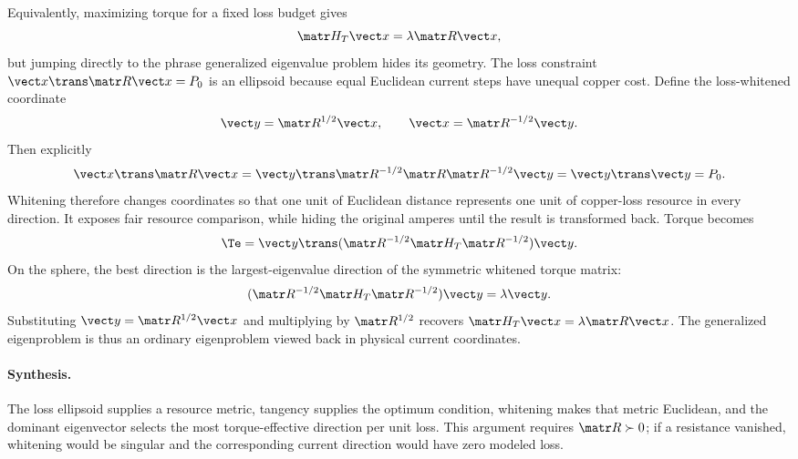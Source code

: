 Equivalently, maximizing torque for a fixed loss budget gives
\begin{equation}
 \Hm\state=\lambda\Rl\state,\label{eq:generalized-eigenproblem}
\end{equation}
but jumping directly to the phrase generalized eigenvalue problem hides its
geometry.  The loss constraint
$\state\trans\Rl\state=P_0$ is an ellipsoid because equal Euclidean current
steps have unequal copper cost.  Define the loss-whitened coordinate
\begin{equation}
 \vect y=\Rl^{1/2}\state,\qquad
 \state=\Rl^{-1/2}\vect y.
\end{equation}
Then explicitly
\begin{equation}
 \state\trans\Rl\state
 =\vect y\trans\Rl^{-1/2}\Rl\Rl^{-1/2}\vect y
 =\vect y\trans\vect y=P_0.
\end{equation}
Whitening therefore changes coordinates so that one unit of Euclidean
distance represents one unit of copper-loss resource in every direction.  It
exposes fair resource comparison, while hiding the original amperes until the
result is transformed back.  Torque becomes
\begin{equation}
 \Te=\vect y\trans(\Rl^{-1/2}\Hm\Rl^{-1/2})\vect y.
\end{equation}
On the sphere, the best direction is the largest-eigenvalue direction of the
symmetric whitened torque matrix:
\begin{equation}
 (\Rl^{-1/2}\Hm\Rl^{-1/2})\vect y=\lambda\vect y.
\end{equation}
Substituting $\vect y=\Rl^{1/2}\state$ and multiplying by
$\Rl^{1/2}$ recovers
$\Hm\state=\lambda\Rl\state$.  The generalized eigenproblem is thus an
ordinary eigenproblem viewed back in physical current coordinates.

\paragraph{Synthesis.}
The loss ellipsoid supplies a resource metric, tangency supplies the optimum
condition, whitening makes that metric Euclidean, and the dominant eigenvector
selects the most torque-effective direction per unit loss.  This argument
requires $\Rl\succ0$; if a resistance vanished, whitening would be singular
and the corresponding current direction would have zero modeled loss.
